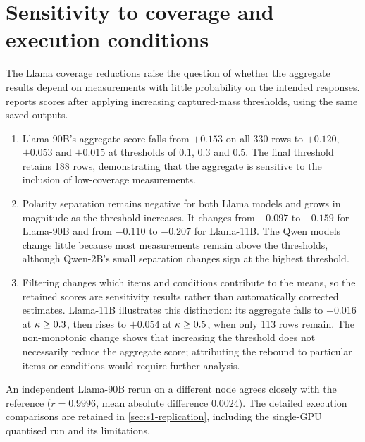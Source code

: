 \section{Sensitivity to coverage and execution conditions}\label{sec:s1-sensitivity}

The Llama coverage reductions raise the question of whether the aggregate
results depend on measurements with little probability on the intended
responses.  reports scores after applying increasing
captured-mass thresholds, using the same saved outputs.

\begin{enumerate}[leftmargin=*,itemsep=0.5em]
\item Llama-90B's aggregate score falls from $+0.153$ on all 330 rows to
$+0.120$, $+0.053$ and $+0.015$ at thresholds of $0.1$, $0.3$ and $0.5$.
The final threshold retains 188 rows, demonstrating that the aggregate is
sensitive to the inclusion of low-coverage measurements.

\item Polarity separation remains negative for both Llama models and grows
in magnitude as the threshold increases. It changes from $-0.097$ to
$-0.159$ for Llama-90B and from $-0.110$ to $-0.207$ for Llama-11B.
The Qwen models change little because most measurements remain above the
thresholds, although Qwen-2B's small separation changes sign at the highest
threshold.

\item Filtering changes which items and conditions contribute to the means,
so the retained scores are sensitivity results rather than automatically
corrected estimates. Llama-11B illustrates this distinction: its aggregate
falls to $+0.016$ at $\kappa\ge0.3$, then rises to $+0.054$ at
$\kappa\ge0.5$, when only 113 rows remain. The non-monotonic change shows
that increasing the threshold does not necessarily reduce the aggregate
score; attributing the rebound to particular items or conditions would
require further analysis.
\end{enumerate}

An independent Llama-90B rerun on a different node agrees closely with the
reference ($r=0.9996$, mean absolute difference $0.0024$).
The detailed execution comparisons are retained in \cref{sec:s1-replication},
including the single-GPU quantised run and its limitations.

